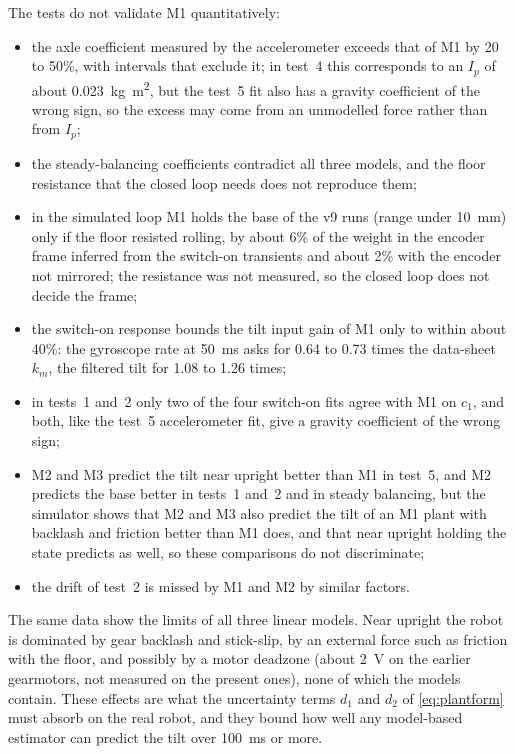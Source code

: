 The tests do not validate M1 quantitatively:
\begin{itemize}[leftmargin=*]
\item the axle coefficient measured by the accelerometer exceeds that of M1 by
20 to 50\%, with intervals that exclude it; in test~4 this corresponds to an
$I_p$ of about \SI{0.023}{kg.m^2}, but the test~5 fit also has a gravity
coefficient of the wrong sign, so the excess may come from an unmodelled force
rather than from $I_p$;
\item the steady-balancing coefficients contradict all three models, and the
floor resistance that the closed loop needs does not reproduce them;
\item in the simulated loop M1 holds the base of the v9 runs (range under
\SI{10}{mm}) only if the floor resisted rolling, by about 6\% of the weight in
the encoder frame inferred from the switch-on transients and about 2\% with
the encoder not mirrored; the resistance was not measured, so the closed loop
does not decide the frame;
\item the switch-on response bounds the tilt input gain of M1 only to within
about 40\%: the gyroscope rate at \SI{50}{ms} asks for 0.64 to 0.73 times the
data-sheet $k_m$, the filtered tilt for 1.08 to 1.26 times;
\item in tests~1 and~2 only two of the four switch-on fits agree with M1 on
$c_1$, and both, like the test~5 accelerometer fit, give a gravity coefficient
of the wrong sign;
\item M2 and M3 predict the tilt near upright better than M1 in test~5, and M2
predicts the base better in tests~1 and~2 and in steady balancing, but the
simulator shows that M2 and M3 also predict the tilt of an M1 plant with
backlash and friction better than M1 does, and that near upright holding the
state predicts as well, so these comparisons do not discriminate;
\item the drift of test~2 is missed by M1 and M2 by similar factors.
\end{itemize}

The same data show the limits of all three linear models. Near upright the
robot is dominated by gear backlash and stick-slip, by an external force such
as friction with the floor, and possibly by a motor deadzone (about \SI{2}{V} on the earlier gearmotors,
not measured on the present ones), none of which the models contain. These
effects are what the uncertainty terms $d_1$ and $d_2$ of \eqref{eq:plantform}
must absorb on the real robot, and they bound how well any model-based
estimator can predict the tilt over \SI{100}{ms} or more.

